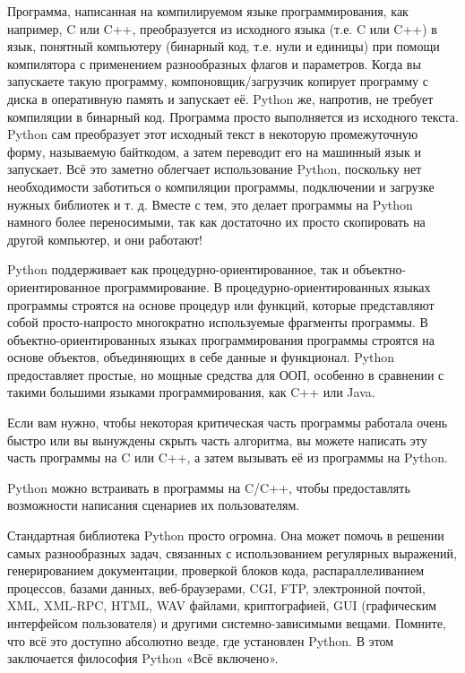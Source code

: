 \documentclass[11pt,a4paper]{report}
\begin{document}
Программа, написанная на компилируемом языке программирования, как например, C или C++, преобразуется из исходного языка (т.е. C или C++) в язык, понятный компьютеру (бинарный код, т.е. нули и единицы) при помощи компилятора с применением разнообразных флагов и параметров. Когда вы запускаете такую программу, компоновщик/загрузчик копирует программу с диска в оперативную память и запускает её.  Python же, напротив, не требует компиляции в бинарный код. Программа просто выполняется из исходного текста. Python сам преобразует этот исходный текст в некоторую промежуточную форму, называемую байткодом, а затем переводит его на машинный язык и запускает. Всё это заметно облегчает использование Python, поскольку нет необходимости заботиться о компиляции программы, подключении и загрузке нужных библиотек и т. д. Вместе с тем, это делает программы на Python намного более переносимыми, так как достаточно их просто скопировать на другой компьютер, и они работают!

Python поддерживает как процедурно-ориентированное, так и объектно-ориентированное программирование. В процедурно-ориентированных языках программы строятся на основе процедур или функций, которые представляют собой просто-напросто многократно используемые фрагменты программы. В объектно-ориентированных языках программирования программы строятся на основе объектов, объединяющих в себе данные и функционал. Python предоставляет простые, но мощные средства для ООП, особенно в сравнении с такими большими языками программирования, как C++ или Java.

Если вам нужно, чтобы некоторая критическая часть программы работала очень быстро или вы вынуждены скрыть часть алгоритма, вы можете написать эту часть программы на C или C++, а затем вызывать её из программы на Python.

Python можно встраивать в программы на C/C++, чтобы предоставлять возможности написания сценариев их пользователям.

Стандартная библиотека Python просто огромна. Она может помочь в решении самых разнообразных задач, связанных с использованием регулярных выражений, генерированием документации, проверкой блоков кода, распараллеливанием процессов, базами данных, веб-браузерами, CGI, FTP, электронной почтой, XML, XML-RPC, HTML, WAV файлами, криптографией, GUI (графическим интерфейсом пользователя) и другими системно-зависимыми вещами. Помните, что всё это доступно абсолютно везде, где установлен Python. В этом заключается философия Python «Всё включено».
\end{document}

